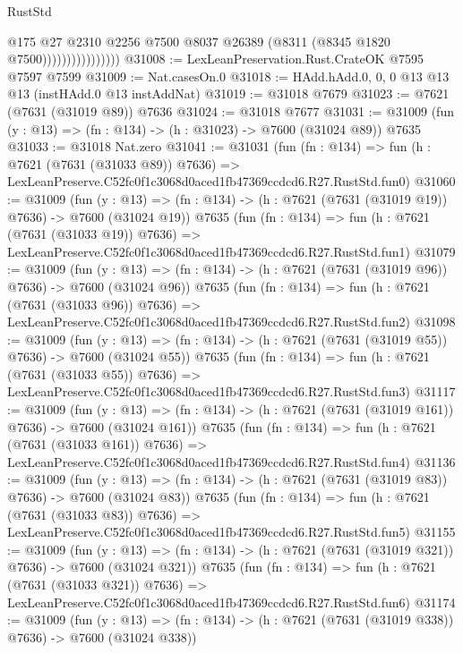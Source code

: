 \begin{lexlean}{RustStd}
\begin{coremodule}
                                @175
                                @27
                                @2310
                                @2256
                                @7500
                                @8037
                                @26389
                                (@8311 (@8345 @1820 @7500))))))))))))))))
@31008 := LexLeanPreservation.Rust.CrateOK @7595 @7597 @7599
@31009 := Nat.casesOn.{0}
@31018 := HAdd.hAdd.{0, 0, 0} @13 @13 @13 (instHAdd.{0} @13 instAddNat)
@31019 := @31018 @7679
@31023 := @7621 (@7631 (@31019 @89)) @7636
@31024 := @31018 @7677
@31031 := @31009 (fun (y : @13) => (fn : @134) -> (h : @31023) -> @7600 (@31024 @89)) @7635
@31033 := @31018 Nat.zero
@31041 := @31031
    (fun (fn : @134) =>
    fun (h : @7621 (@7631 (@31033 @89)) @7636) =>
    LexLeanPreserve.C52fc0f1c3068d0aced1fb47369ccdcd6.R27.RustStd.fun0)
@31060 := @31009
    (fun (y : @13) => (fn : @134) -> (h : @7621 (@7631 (@31019 @19)) @7636) -> @7600 (@31024 @19))
    @7635
    (fun (fn : @134) =>
    fun (h : @7621 (@7631 (@31033 @19)) @7636) =>
    LexLeanPreserve.C52fc0f1c3068d0aced1fb47369ccdcd6.R27.RustStd.fun1)
@31079 := @31009
    (fun (y : @13) => (fn : @134) -> (h : @7621 (@7631 (@31019 @96)) @7636) -> @7600 (@31024 @96))
    @7635
    (fun (fn : @134) =>
    fun (h : @7621 (@7631 (@31033 @96)) @7636) =>
    LexLeanPreserve.C52fc0f1c3068d0aced1fb47369ccdcd6.R27.RustStd.fun2)
@31098 := @31009
    (fun (y : @13) => (fn : @134) -> (h : @7621 (@7631 (@31019 @55)) @7636) -> @7600 (@31024 @55))
    @7635
    (fun (fn : @134) =>
    fun (h : @7621 (@7631 (@31033 @55)) @7636) =>
    LexLeanPreserve.C52fc0f1c3068d0aced1fb47369ccdcd6.R27.RustStd.fun3)
@31117 := @31009
    (fun (y : @13) => (fn : @134) -> (h : @7621 (@7631 (@31019 @161)) @7636) -> @7600 (@31024 @161))
    @7635
    (fun (fn : @134) =>
    fun (h : @7621 (@7631 (@31033 @161)) @7636) =>
    LexLeanPreserve.C52fc0f1c3068d0aced1fb47369ccdcd6.R27.RustStd.fun4)
@31136 := @31009
    (fun (y : @13) => (fn : @134) -> (h : @7621 (@7631 (@31019 @83)) @7636) -> @7600 (@31024 @83))
    @7635
    (fun (fn : @134) =>
    fun (h : @7621 (@7631 (@31033 @83)) @7636) =>
    LexLeanPreserve.C52fc0f1c3068d0aced1fb47369ccdcd6.R27.RustStd.fun5)
@31155 := @31009
    (fun (y : @13) => (fn : @134) -> (h : @7621 (@7631 (@31019 @321)) @7636) -> @7600 (@31024 @321))
    @7635
    (fun (fn : @134) =>
    fun (h : @7621 (@7631 (@31033 @321)) @7636) =>
    LexLeanPreserve.C52fc0f1c3068d0aced1fb47369ccdcd6.R27.RustStd.fun6)
@31174 := @31009
    (fun (y : @13) => (fn : @134) -> (h : @7621 (@7631 (@31019 @338)) @7636) -> @7600 (@31024 @338))

\end{coremodule}
\end{lexlean}
